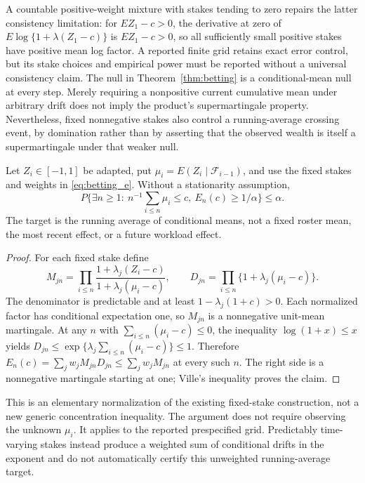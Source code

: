 A countable positive-weight mixture with stakes tending to zero repairs
the latter consistency limitation: for $EZ_1-c>0$, the derivative at
zero of $E\log\{1+\lambda(Z_1-c)\}$ is $EZ_1-c>0$, so all sufficiently
small positive stakes have positive mean log factor. A reported finite
grid retains exact error control, but its stake choices and empirical
power must be reported without a universal consistency claim.
The null in Theorem~\ref{thm:betting} is a conditional-mean null at
every step. Merely requiring a nonpositive current cumulative mean under
arbitrary drift does not imply the product's supermartingale property.
Nevertheless, fixed nonnegative stakes also control a running-average
crossing event, by domination rather than by asserting that the observed
wealth is itself a supermartingale under that weaker null.

\begin{proposition}
\label{prop:bet_running}
Let $Z_i\in[-1,1]$ be adapted, put
$\mu_i=E(Z_i\mid\mathcal F_{i-1})$, and use the fixed stakes and weights
in \eqref{eq:betting_e}. Without a stationarity assumption,
\[
 P\{\exists n\geq1:\ n^{-1}\textstyle\sum_{i\leq n}\mu_i\leq c,
                   \ E_n(c)\geq1/\alpha\}\leq\alpha.
\]
The target is the running average of conditional means, not a fixed
roster mean, the most recent effect, or a future workload effect.
\end{proposition}
\begin{proof}
For each fixed stake define
\[
 M_{jn}=\prod_{i\leq n}
       \frac{1+\lambda_j(Z_i-c)}{1+\lambda_j(\mu_i-c)},\qquad
 D_{jn}=\prod_{i\leq n}\{1+\lambda_j(\mu_i-c)\}.
\]
The denominator is predictable and at least
$1-\lambda_j(1+c)>0$. Each normalized factor has conditional
expectation one, so $M_{jn}$ is a nonnegative unit-mean martingale.
At any $n$ with $\sum_{i\leq n}(\mu_i-c)\leq0$, the inequality
$\log(1+x)\leq x$ yields
$D_{jn}\leq\exp\{\lambda_j\sum_{i\leq n}(\mu_i-c)\}\leq1$.
Therefore $E_n(c)=\sum_jw_jM_{jn}D_{jn}\leq\sum_jw_jM_{jn}$ at
every such $n$. The right side is a nonnegative martingale starting
at one; Ville's inequality proves the claim.
\end{proof}

This is an elementary normalization of the existing fixed-stake
construction, not a new generic concentration inequality. The argument
does not require observing the unknown $\mu_i$. It applies to the
reported prespecified grid. Predictably time-varying stakes instead
produce a weighted sum of conditional drifts in the exponent and do not
automatically certify this unweighted running-average target.

